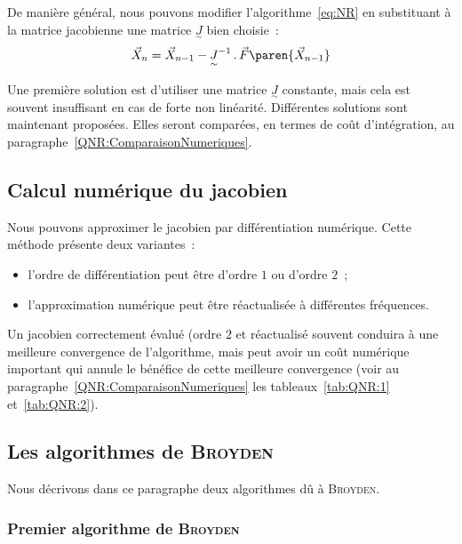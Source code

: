 \documentclass[12pt]{article}
\begin{document}
De manière général, nous pouvons modifier l'algorithme~\eqref{eq:NR} en
substituant à la matrice jacobienne une matrice
\(\underset{\sim}{J}\) bien choisie~:
\begin{equation}
  \label{eq:QNR}
  \vec{X}_{n}=\vec{X}_{n-1}-\underset{\sim}{J}^{-1}\,.\,\vec{F}\paren{\vec{X}_{n-1}}
\end{equation}

Une première solution est d'utiliser une matrice \(\underset{\sim}{J}\)
constante, mais cela est souvent insuffisant en cas de forte non
linéarité. Différentes solutions sont maintenant proposées. Elles seront
comparées, en termes de coût d'intégration, au
paragraphe~\ref{QNR:ComparaisonNumeriques}.

\subsection{Calcul numérique du jacobien}

Nous pouvons approximer le jacobien par différentiation numérique. Cette
méthode présente deux variantes~:
\begin{itemize}
  \item l'ordre de différentiation peut être d'ordre \(1\) ou d'ordre
  \(2\)~;
  \item l'approximation numérique peut être réactualisée à différentes
  fréquences.
\end{itemize}

Un jacobien correctement évalué (ordre \(2\) et réactualisé souvent
conduira à une meilleure convergence de l'algorithme, mais peut avoir un
coût numérique important qui annule le bénéfice de cette meilleure
convergence (voir au paragraphe~\ref{QNR:ComparaisonNumeriques} les
tableaux~\ref{tab:QNR:1} et~\ref{tab:QNR:2}).

\subsection{Les algorithmes de \textsc{Broyden}}

Nous décrivons dans ce paragraphe deux algorithmes dû à \textsc{Broyden}.

\subsubsection{Premier algorithme de \textsc{Broyden}}
\end{document}
